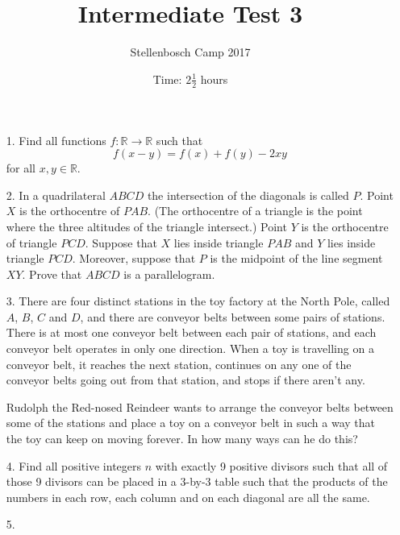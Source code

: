 \documentclass[12pt]{article}
\title{Intermediate Test 3}
\author{Stellenbosch Camp 2017}
\date{Time: $2\frac{1}{2}$ hours}
\begin{document}
 \maketitle

\begin{enumerate}

\item[1.]  
Find all functions $f:\mathbb{R} \rightarrow \mathbb{R}$ such that
    $$ f(x-y)=f(x)+f(y)-2xy $$
    for all $x, y \in \mathbb{R}$.


\item[2.] %
In a quadrilateral $ABCD$ the intersection of the diagonals is called $P$. Point $X$ is the orthocentre of $PAB$. (The orthocentre of a triangle is the point where the three altitudes of the triangle intersect.) Point $Y$ is the orthocentre of triangle $PCD$. Suppose that $X$ lies inside triangle $PAB$ and $Y$ lies inside triangle $PCD$. Moreover, suppose that $P$ is the midpoint of the line segment $XY$. Prove that $ABCD$ is a parallelogram.


\item[3.] %
There are four distinct stations in the toy factory at the North Pole, called $A$, $B$, $C$ and $D$, and there are conveyor belts between some pairs of stations. There is at most one conveyor belt between each pair of stations, and each conveyor belt operates in only one direction. When a toy is travelling on a conveyor belt, it reaches the next station, continues on any one of the conveyor belts going out from that station, and stops if there aren't any.

Rudolph the Red-nosed Reindeer wants to arrange the conveyor belts between some of the stations and place a toy on a conveyor belt in such a way that the toy can keep on moving forever. In how many ways can he do this?


\item[4.] %
Find all positive integers $n$ with exactly 9 positive divisors such that all of those 9 divisors can be placed in a 3-by-3 table such that the products of the numbers in each row, each column and on each diagonal are all the same.


\item[5.] %


\end{enumerate}
\end{document}
